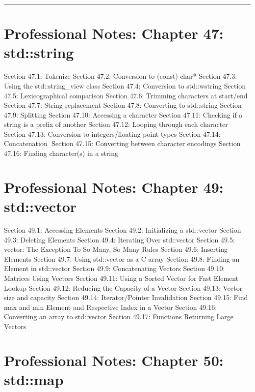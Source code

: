 \begin{center}\rule{0.5\linewidth}{0.5pt}\end{center}

\hypertarget{professional-notes-chapter-47-stdstring}{%
\chapter{Professional Notes: Chapter 47:
std::string}\label{professional-notes-chapter-47-stdstring}}

Section 47.1: Tokenize Section 47.2: Conversion to (const) char* Section
47.3: Using the std::string\_view class Section 47.4: Conversion to
std::wstring Section 47.5: Lexicographical comparison Section 47.6:
Trimming characters at start/end Section 47.7: String replacement
Section 47.8: Converting to std::string Section 47.9: Splitting Section
47.10: Accessing a character Section 47.11: Checking if a string is a
preﬁx of another Section 47.12: Looping through each character Section
47.13: Conversion to integers/ﬂoating point types Section 47.14:
Concatenation Section 47.15: Converting between character encodings
Section 47.16: Finding character(s) in a string

\hypertarget{professional-notes-chapter-49-stdvector}{%
\chapter{Professional Notes: Chapter 49:
std::vector}\label{professional-notes-chapter-49-stdvector}}

Section 49.1: Accessing Elements Section 49.2: Initializing a
std::vector Section 49.3: Deleting Elements Section 49.4: Iterating Over
std::vector Section 49.5: vector: The Exception To So Many, So Many
Rules Section 49.6: Inserting Elements Section 49.7: Using std::vector
as a C array Section 49.8: Finding an Element in std::vector Section
49.9: Concatenating Vectors Section 49.10: Matrices Using Vectors
Section 49.11: Using a Sorted Vector for Fast Element Lookup Section
49.12: Reducing the Capacity of a Vector Section 49.13: Vector size and
capacity Section 49.14: Iterator/Pointer Invalidation Section 49.15:
Find max and min Element and Respective Index in a Vector Section 49.16:
Converting an array to std::vector Section 49.17: Functions Returning
Large Vectors

\hypertarget{professional-notes-chapter-50-stdmap}{%
\chapter{Professional Notes: Chapter 50:
std::map}\label{professional-notes-chapter-50-stdmap}}


